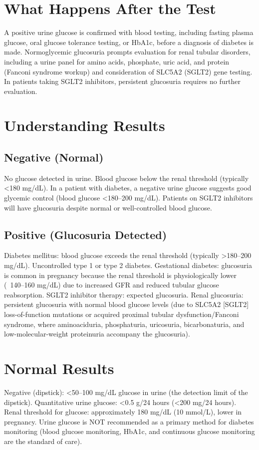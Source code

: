 \section*{What Happens After the Test}
A positive urine glucose is confirmed with blood testing, including fasting plasma glucose, oral glucose tolerance testing, or HbA1c, before a diagnosis of diabetes is made. Normoglycemic glucosuria prompts evaluation for renal tubular disorders, including a urine panel for amino acids, phosphate, uric acid, and protein (Fanconi syndrome workup) and consideration of SLC5A2 (SGLT2) gene testing. In patients taking SGLT2 inhibitors, persistent glucosuria requires no further evaluation.
\section*{Understanding Results}
\subsection*{Negative (Normal)}
No glucose detected in urine. Blood glucose below the renal threshold (typically <180 mg/dL). In a patient with diabetes, a negative urine glucose suggests good glycemic control (blood glucose <180--200 mg/dL). Patients on SGLT2 inhibitors will have glucosuria despite normal or well-controlled blood glucose.
\subsection*{Positive (Glucosuria Detected)}
Diabetes mellitus: blood glucose exceeds the renal threshold (typically >180--200 mg/dL). Uncontrolled type 1 or type 2 diabetes. Gestational diabetes: glucosuria is common in pregnancy because the renal threshold is physiologically lower (~140--160 mg/dL) due to increased GFR and reduced tubular glucose reabsorption. SGLT2 inhibitor therapy: expected glucosuria. Renal glucosuria: persistent glucosuria with normal blood glucose levels (due to SLC5A2 [SGLT2] loss-of-function mutations or acquired proximal tubular dysfunction/Fanconi syndrome, where aminoaciduria, phosphaturia, uricosuria, bicarbonaturia, and low-molecular-weight proteinuria accompany the glucosuria).
\section*{Normal Results}
Negative (dipstick): <50--100 mg/dL glucose in urine (the detection limit of the dipstick). Quantitative urine glucose: <0.5 g/24 hours (<200 mg/24 hours). Renal threshold for glucose: approximately 180 mg/dL (10 mmol/L), lower in pregnancy. Urine glucose is NOT recommended as a primary method for diabetes monitoring (blood glucose monitoring, HbA1c, and continuous glucose monitoring are the standard of care).

